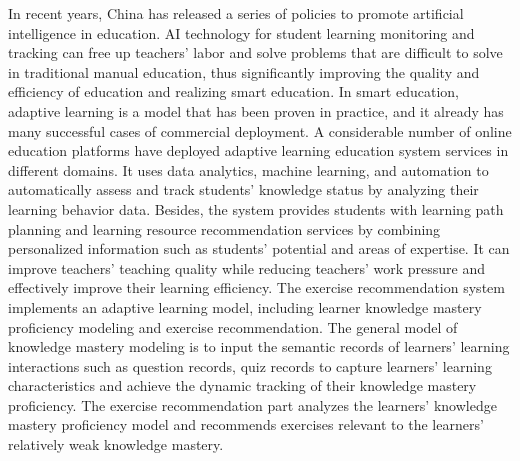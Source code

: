 
In recent years, China has released a series of policies to promote artificial intelligence in education. AI technology for student learning monitoring and tracking can free up teachers' labor and solve problems that are difficult to solve in traditional manual education, thus significantly improving the quality and efficiency of education and realizing smart education. In smart education, adaptive learning is a model that has been proven in practice, and it already has many successful cases of commercial deployment. A considerable number of online education platforms have deployed adaptive learning education system services in different domains. It uses data analytics, machine learning, and automation to automatically assess and track students' knowledge status by analyzing their learning behavior data. Besides, the system provides students with learning path planning and learning resource recommendation services by combining personalized information such as students' potential and areas of expertise. It can improve teachers' teaching quality while reducing teachers' work pressure and effectively improve their learning efficiency. The exercise recommendation system implements an adaptive learning model, including learner knowledge mastery proficiency modeling and exercise recommendation. The general model of knowledge mastery modeling is to input the semantic records of learners' learning interactions such as question records, quiz records to capture learners' learning characteristics and achieve the dynamic tracking of their knowledge mastery proficiency. The exercise recommendation part analyzes the learners' knowledge mastery proficiency model and recommends exercises relevant to the learners' relatively weak knowledge mastery.

